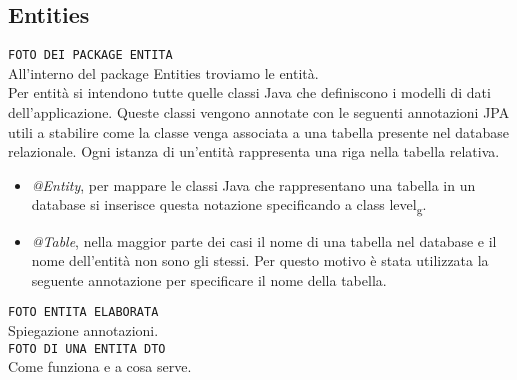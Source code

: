 \subsection{Entities}

\texttt{FOTO DEI PACKAGE ENTITA}\\

\noindent All'interno del package Entities troviamo le entità.\\
Per entità si intendono tutte quelle classi Java che definiscono i modelli di dati dell'applicazione. Queste classi vengono annotate con le seguenti annotazioni JPA utili a stabilire come la classe venga associata a una tabella presente nel database relazionale. Ogni istanza di un'entità rappresenta una riga nella tabella relativa.
\begin{itemize}
\item \textit{@Entity}, per mappare le classi Java che rappresentano una tabella in un database si inserisce questa notazione specificando a class level\textsubscript{g}.
\item \textit{@Table}, nella maggior parte dei casi il nome di una tabella nel database e il nome dell'entità non sono gli stessi. Per questo motivo è stata utilizzata la seguente annotazione per specificare il nome della tabella.
\end{itemize} 

\noindent \texttt{FOTO ENTITA ELABORATA}\\

\noindent Spiegazione annotazioni.\\

\noindent \texttt{FOTO DI UNA ENTITA DTO}\\

\noindent Come funziona e a cosa serve.\\